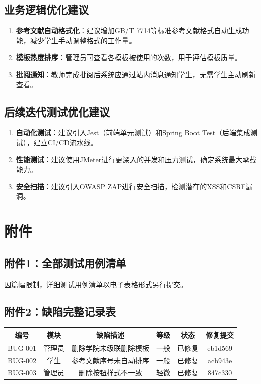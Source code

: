 \documentclass[a4paper,12pt]{article}
\begin{document}
\subsection{业务逻辑优化建议}
\begin{enumerate}
  \item \textbf{参考文献自动格式化}：建议增加GB/T 7714等标准参考文献格式自动生成功能，减少学生手动调整格式的工作量。
  \item \textbf{模板热度排序}：管理员可查看各模板被使用的次数，用于评估模板质量。
  \item \textbf{批阅通知}：教师完成批阅后系统应通过站内消息通知学生，无需学生主动刷新查看。
\end{enumerate}

\subsection{后续迭代测试优化建议}
\begin{enumerate}
  \item \textbf{自动化测试}：建议引入Jest（前端单元测试）和Spring Boot Test（后端集成测试），建立CI/CD流水线。
  \item \textbf{性能测试}：建议使用JMeter进行更深入的并发和压力测试，确定系统最大承载能力。
  \item \textbf{安全扫描}：建议引入OWASP ZAP进行安全扫描，检测潜在的XSS和CSRF漏洞。
\end{enumerate}

\section{附件}

\subsection{附件1：全部测试用例清单}
因篇幅限制，详细测试用例清单以电子表格形式另行提交。

\subsection{附件2：缺陷完整记录表}
\begin{center}
\begin{tabular}{|c|c|c|c|c|c|}
\hline
编号 & 模块 & 缺陷描述 & 等级 & 状态 & 修复提交 \\
\hline
BUG-001 & 管理员 & 删除学院未级联删除模板 & 一般 & 已修复 & eb1d569 \\
BUG-002 & 学生 & 参考文献序号未自动排序 & 一般 & 已修复 & acb943e \\
BUG-003 & 管理员 & 删除按钮样式不一致 & 轻微 & 已修复 & 847c330 \\
\hline
\end{tabular}
\end{center}
\end{document}
